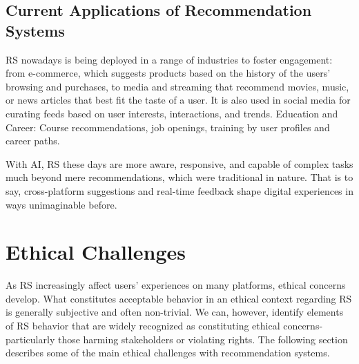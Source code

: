 \documentclass{article}
\begin{document}
\subsection{Current Applications of Recommendation Systems}

RS nowadays is being deployed in a range of industries to foster engagement: from e-commerce, which suggests products based on the history of the users' browsing and purchases, to media and streaming that recommend movies, music, or news articles that best fit the taste of a user. It is also used in social media for curating feeds based on user interests, interactions, and trends.
Education and Career: Course recommendations, job openings, training by user profiles and career paths.

With AI, RS these days are more aware, responsive, and capable of complex tasks much beyond mere recommendations, which were traditional in nature. That is to say, cross-platform suggestions and real-time feedback shape digital experiences in ways unimaginable before.
\section{Ethical Challenges}
As RS increasingly affect users' experiences on many platforms, ethical concerns develop. What constitutes acceptable behavior in an ethical context regarding RS is generally subjective and often non-trivial.\cite{RS_ELI} We can, however, identify elements of RS behavior that are widely recognized as constituting ethical concerns-particularly those harming stakeholders or violating rights.\cite{IaAEC_in_RS} The following section describes some of the main ethical challenges with recommendation systems.
\end{document}

